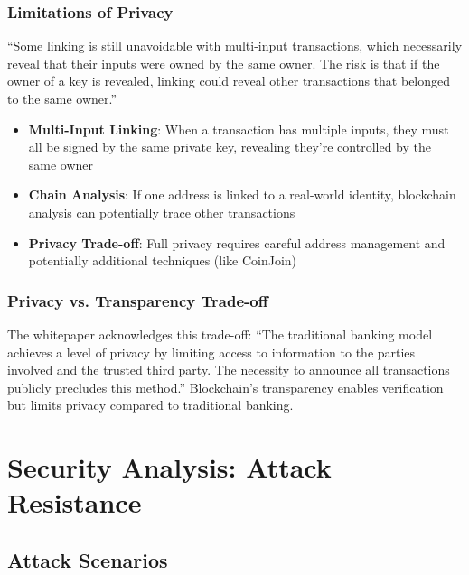 \subsubsection{Limitations of Privacy}

``Some linking is still unavoidable with multi-input transactions, which necessarily reveal that their inputs were owned by the same owner. The risk is that if the owner of a key is revealed, linking could reveal other transactions that belonged to the same owner.''

\begin{itemize}
  \item \textbf{Multi-Input Linking}: When a transaction has multiple inputs, they must all be signed by the same private key, revealing they're controlled by the same owner

  \item \textbf{Chain Analysis}: If one address is linked to a real-world identity, blockchain analysis can potentially trace other transactions

  \item \textbf{Privacy Trade-off}: Full privacy requires careful address management and potentially additional techniques (like CoinJoin)
\end{itemize}

\subsubsection{Privacy vs. Transparency Trade-off}

The whitepaper acknowledges this trade-off: ``The traditional banking model achieves a level of privacy by limiting access to information to the parties involved and the trusted third party. The necessity to announce all transactions publicly precludes this method.'' Blockchain's transparency enables verification but limits privacy compared to traditional banking.


\section{Security Analysis: Attack Resistance}
\label{sec:security-analysis}

\subsection{Attack Scenarios}
\label{subsec:attack-scenarios}

